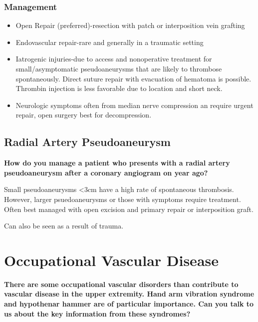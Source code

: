 \documentclass[
]{book}
\begin{document}
\hypertarget{management-4}{%
\subsubsection{Management}\label{management-4}}

\begin{itemize}
\item
  Open Repair (preferred)-resection with patch or interposition vein
  grafting
\item
  Endovascular repair-rare and generally in a traumatic setting
\item
  Iatrogenic injuries-due to access and nonoperative treatment for
  small/asymptomatic pseudoaneurysms that are likely to thrombose
  spontaneously. Direct suture repair with evacuation of hematoma is
  possible. Thrombin injection is less favorable due to location and
  short neck.
\item
  Neurologic symptoms often from median nerve compression an require
  urgent repair, open surgery best for decompression.
\end{itemize}

\hypertarget{radial-artery-pseudoaneurysm}{%
\subsection{Radial Artery Pseudoaneurysm}\label{radial-artery-pseudoaneurysm}}

\textbf{How do you manage a patient who presents with a radial artery
pseudoaneurysm after a coronary angiogram on year ago?}

Small pseudoaneurysms \textless3cm have a high rate of spontaneous thrombosis.
However, larger psuedoaneurysms or those with symptoms require
treatment. Often best managed with open excision and primary repair or
interposition graft.\citep{tosti2017}

Can also be seen as a result of trauma.\citep{bagir2017}

\hypertarget{occupational-vascular-disease}{%
\section{Occupational Vascular Disease}\label{occupational-vascular-disease}}

\textbf{There are some occupational vascular disorders than contribute to
vascular disease in the upper extremity. Hand arm vibration syndrome and
hypothenar hammer are of particular importance. Can you talk to us about
the key information from these syndromes?}
\citep{eskandari185ConditionsArising2020}
\end{document}
